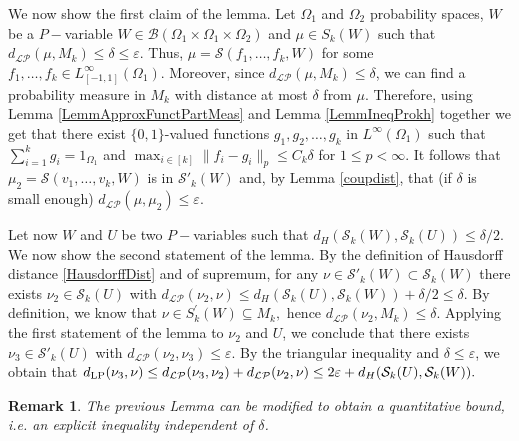 \documentclass[11pt]{article}
\newtheorem{remark}[theorem]{Remark}
\newcommand{\cB}{{\mathcal B}}  %
\begin{document}
\proof
We now show the first claim of the lemma. Let $\Omega_1$ and $\Omega_2$ probability spaces, $W$ be a $P-$variable $W\in \cB(\Omega_1\times \Omega_1\times \Omega_2)$  and $\mu\in S_k(W)$ such that $d_{\mathcal{LP}}(\mu,M_k)\leq\delta\leq \varepsilon.$  Thus, $\mu=\mathcal{S}(f_1,\ldots,f_k,W)$ for some $f_1,\ldots,f_k\in L_{[-1,1]}^{\infty}(\Omega_1)$. Moreover, since $d_{\mathcal{LP}}(\mu,M_k)\leq \delta$, we can find a probability measure in $M_k$ with distance at most $\delta$ from $\mu$.  Therefore, using Lemma \ref{LemmApproxFunctPartMeas} and Lemma \ref{LemmIneqProkh} together we get that there exist $\{0,1\}$-valued functions  $g_1,g_2,\dots,g_k$ in $L^{\infty}(\Omega_1)$ such that $\sum_{i=1}^k g_i=1_{\Omega_1}$ and $\max_{i\in [k]}\|f_i-g_i\|_p\leq C_k\delta$ for $1 \leq p < \infty$. It follows that $\mu_2=\mathcal{S}(v_1,\ldots,v_k,W)$ is in $\mathcal{S}'_k(W)$ and, by Lemma \ref{coupdist},  that (if $\delta$ is small enough) $d_{\mathcal{LP}}(\mu, \mu_2)\leq \varepsilon.$

Let now $W$ and $U$ be two $P-$variables such that $d_H(\mathcal{S}_k(W),\mathcal{S}_k(U))\leq\delta/2$. We now show the second statement of the lemma. By the definition of Hausdorff distance \ref{HausdorffDist} and of supremum, for any $\nu\in \mathcal{S}'_k(W)\subset \mathcal{S}_k(W)$ there exists  $\nu_2\in\mathcal{S}_k(U)$ with $d_{\mathcal{LP}}(\nu_2,\nu)\leq d_H(\mathcal{S}_k(U),\mathcal{S}_k(W))+\delta/2 \leq\delta.$ By definition, we know that $\nu \in S^{\prime}_k(W)\subseteq M_k,$ hence $d_{\mathcal{LP}}(\nu_2,M_k)\leq \delta$. Applying the first statement of the lemma to $\nu_2$ and $U$, we conclude that there exists $\nu_3\in\mathcal{S}'_k(U)$ with $d_{\mathcal{LP}}(\nu_2,\nu_3)\leq\varepsilon$. By the triangular inequality and $\delta \leq \varepsilon$, we obtain that $d_{\rm LP}(\nu_3,\nu)\leq d_{\mathcal{LP}}(\nu_3,\nu_2)+ d_{\mathcal{LP}}(\nu_2,\nu)\leq 2\varepsilon+d_H(\mathcal{S}_k(U),\mathcal{S}_k(W)).$
\endproof


\begin{remark}
The previous Lemma can be modified to obtain a quantitative bound, i.e. an explicit inequality independent of $\delta$.
\end{remark}
\end{document}
